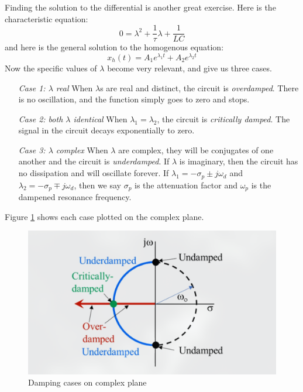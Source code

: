 \documentclass[nobib]{tufte-handout}
\begin{document}
Finding the solution to the differential is 
another great exercise. Here is the characteristic 
equation:
\begin{equation}
    0 = \lambda^2 + \frac{1}{\tau} \lambda + \frac{1}{LC}
\end{equation}
and here is the general solution
to the homogenous equation:
\begin{equation}
    x_h(t) = A_1 e^{\lambda_1 t} + A_2 e^{\lambda_2 t}
\end{equation}
Now the specific values of $\lambda$ 
become very relevant, and give us three cases. 
\begin{itemize}
    \item[\emph{Case 1: $\lambda$ real}]
    When $\lambda$s are real and distinct, the 
    circuit is \emph{overdamped}. There is 
    no oscillation, and the function simply goes to
    zero and stops. 
    \item[\emph{Case 2: both $\lambda$ identical}]
    When $\lambda_1 = \lambda_2$, the circuit 
    is \emph{critically damped}. The signal 
    in the circuit decays exponentially to zero. 
    \item[\emph{Case 3: $\lambda$ complex}] When $\lambda$ are complex, they will 
    be conjugates of one another and 
    the circuit is \emph{underdamped}. 
    If $\lambda$ is imaginary, then 
    the circuit has no dissipation and 
    will oscillate forever. If 
    $\lambda_1 = -\sigma_p \pm j\omega_d$ 
    and $\lambda_2 = -\sigma_p \mp j\omega_d$,
    then we say $\sigma_p$ is the attenuation 
    factor and $\omega_p$ is the dampened 
    resonance frequency. 
\end{itemize}
Figure \ref{fig:roots}
shows each case plotted on the complex plane. 
\begin{figure}
    \begin{center}
        \includegraphics{images/roots.png}
    \end{center}
    \caption{Damping cases on complex plane}
    \label{fig:roots}
\end{figure}
\end{document}
